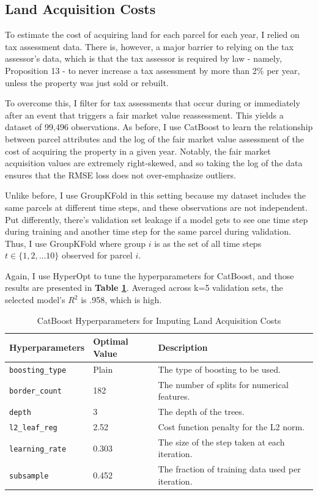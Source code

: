 \documentclass[a4paper,12pt]{article}
\begin{document}
\subsection{Land Acquisition Costs}

To estimate the cost of acquiring land for each parcel for each year, I relied on tax assessment data. There is, however, a major barrier to relying on the tax assessor's data, which is that the tax assessor is required by law - namely, Proposition 13 - to never increase a tax assessment by more than 2\% per year, unless the property was just sold or rebuilt.

To overcome this, I filter for tax assessments that occur during or immediately after an event that triggers a fair market value reassessment. This yields a dataset of 99,496 observations. As before, I use CatBoost to learn the relationship between parcel attributes and the log of the fair market value assessment of the cost of acquiring the property in a given year. Notably, the fair market acquisition values are extremely right-skewed, and so taking the log of the data ensures that the RMSE loss does not over-emphasize outliers.

Unlike before, I use GroupKFold in this setting because my dataset includes the same parcels at different time steps, and these observations are not independent. Put differently, there's validation set leakage if a model gets to see one time step during training and another time step for the same parcel during validation. Thus, I use GroupKFold where group $i$ is as the set of all time steps $t \in \{1, 2, ... 10\}$ observed for parcel $i$.

Again, I use HyperOpt to tune the hyperparameters for CatBoost, and those results are presented in \textbf{Table \ref{tab:BoostedCatHyperparametersLAC}}. Averaged across k=5 validation sets, the selected model's $R^{2}$ is .958, which is high. 

\begin{table}[hbt]
\centering
\caption{CatBoost Hyperparameters for Imputing Land Acquisition Costs}
\begin{tabular}{@{} p{4cm} p{2cm} p{8cm} @{}}
\toprule
\textbf{Hyperparameters}  & \textbf{Optimal Value} & \textbf{Description}\\
\midrule 
\texttt{boosting\_type} & Plain & The type of boosting to be used. \\
\texttt{border\_count} & 182 & The number of splits for numerical features.\\
\texttt{depth} & 3 & The depth of the trees.\\
\texttt{l2\_leaf\_reg} & 2.52 & Cost function penalty for the L2 norm. \\ 
\texttt{learning\_rate} & 0.303 & The size of the step taken at each iteration. \\
\texttt{subsample} & 0.452 & The fraction of training data used per iteration. \\
\bottomrule 
\end{tabular}\\
\label{tab:BoostedCatHyperparametersLAC}
\end{table}
\end{document}
